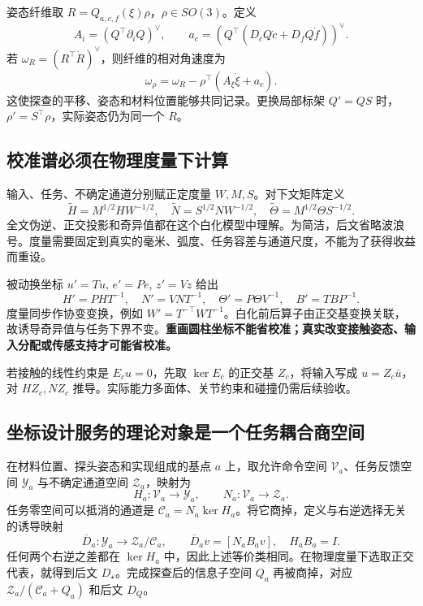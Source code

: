 \documentclass[11pt,a4paper]{article}
\numberwithin{equation}{section}
\theoremstyle{definition}
\begin{document}
姿态纤维取 $R=Q_{a,c,f}(\xi)\rho$，$\rho\in SO(3)$。定义
\begin{equation}
 A_i=(Q^\top\partial_iQ)^\vee,\qquad
 a_c=(Q^\top(D_cQ\dot c+D_fQ\dot f))^\vee .
\end{equation}
若 $\omega_R=(R^\top\dot R)^\vee$，则纤维的相对角速度为
\begin{equation}
 \omega_\rho=\omega_R-\rho^\top(A_\xi\dot\xi+a_c).
\end{equation}
这使探查的平移、姿态和材料位置能够共同记录。更换局部标架 $Q'=QS$ 时，$\rho'=S^\top\rho$，实际姿态仍为同一个 $R$。

\subsection{校准谱必须在物理度量下计算}
输入、任务、不确定通道分别赋正定度量 $W,M,S$。对下文矩阵定义
\begin{equation}
 \widetilde H=M^{1/2}HW^{-1/2},\quad
 \widetilde N=S^{1/2}NW^{-1/2},\quad
 \widetilde\Theta=M^{1/2}\Theta S^{-1/2}.
\end{equation}
全文伪逆、正交投影和奇异值都在这个白化模型中理解。为简洁，后文省略波浪号。度量需要固定到真实的毫米、弧度、任务容差与通道尺度，不能为了获得收益而重设。

被动换坐标 $u'=Tu$, $e'=Pe$, $z'=Vz$ 给出
\begin{equation}
 H'=PHT^{-1},\quad N'=VNT^{-1},\quad
 \Theta'=P\Theta V^{-1},\quad B'=TBP^{-1}.
\end{equation}
度量同步作协变变换，例如 $W'=T^{-\top}WT^{-1}$。白化前后算子由正交基变换关联，故诱导奇异值与任务下界不变。\textbf{重画圆柱坐标不能省校准；真实改变接触姿态、输入分配或传感支持才可能省校准。}

若接触的线性约束是 $E_cu=0$，先取 $\ker E_c$ 的正交基 $Z_c$，将输入写成 $u=Z_c\bar u$，对 $HZ_c,NZ_c$ 推导。实际能力多面体、关节约束和碰撞仍需后续验收。

\subsection{坐标设计服务的理论对象是一个任务耦合商空间}
在材料位置、探头姿态和实现组成的基点 $a$ 上，取允许命令空间 $\mathcal V_a$、任务反馈空间 $\mathcal Y_a$ 与不确定通道空间 $\mathcal Z_a$，映射为
\begin{equation}
 H_a:\mathcal V_a\longrightarrow\mathcal Y_a,\qquad
 N_a:\mathcal V_a\longrightarrow\mathcal Z_a.
\end{equation}
任务零空间可以抵消的通道是 $\mathcal C_a=N_a\ker H_a$。将它商掉，定义与右逆选择无关的诱导映射
\begin{equation}
 \overline D_a:\mathcal Y_a\longrightarrow\mathcal Z_a/\mathcal C_a,
 \qquad \overline D_av=[N_aB_av],\quad H_aB_a=I.
\end{equation}
任何两个右逆之差都在 $\ker H_a$ 中，因此上述等价类相同。在物理度量下选取正交代表，就得到后文 $D_\star$。完成探查后的信息子空间 $Q_a$ 再被商掉，对应 $\mathcal Z_a/(\mathcal C_a+Q_a)$ 和后文 $D_Q$。
\end{document}
